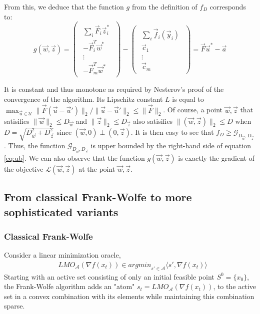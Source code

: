 From this, we deduce that the function $g$ from the definition of $f_D$ corresponds to:
\begin{equation}
  g(\vec w, \vec z) =
  \begin{pmatrix}
    \begin{array}{c}
      \sum_i \vec F_i \vec z_i^*\\
      - \vec F_i^T \vec w^*\\
      \vdots\\
      - \vec F_m^T \vec w^*
    \end{array}
  \end{pmatrix} -
  \begin{pmatrix}
    \begin{array}{c}
      \sum_i \vec f_i (\vec y_i)\\
      \vec c_1\\
      \vdots\\
      \vec c_m
    \end{array}
  \end{pmatrix} = \vec F \vec u^* - \vec a
\end{equation}


It is constant and thus monotone as required by Nesterov's proof of the
convergence of the algorithm. Its Lipschitz constant $L$ is equal to $\max_{\vec
u \in \mathcal{U}} \lVert \vec F (\vec u - \vec u') \rVert_2 / \lVert \vec u -
\vec u' \rVert_2 \leq \lVert \vec F \rVert_2$. Of course, a point $\vec w, \vec
z$ that satisifies $\lVert \vec w \rVert_2 \leq D_{\vec w}$ and $\lVert \vec z
\rVert_2 \leq D_{\vec z}$ also satisifies $\lVert (\vec w, \vec z) \rVert_2 \leq
D$ when $D = \sqrt{D_{\vec w}^2 + D_{\vec z}^2}$ since $(\vec w, 0) \perp (0,
\vec z)$. It is then easy to see that $f_D \geq \mathcal{G}_{D_{\vec w}, D_{\vec
z}}$. Thus, the function $\mathcal{G}_{D_{\vec w}, D_{\vec z}}$ is upper bounded
by the right-hand side of equation \ref{eq:ub}. We can also observe that the
function $g(\vec w, \vec z)$ is exactly the gradient of the objective
$\mathcal{L}(\vec w, \vec z)$ at the point $\vec w, \vec z$.



\subsection{From classical Frank-Wolfe to more sophisticated variants}
\subsubsection{Classical Frank-Wolfe}
Consider a linear minimization oracle,
\begin{equation*}
\begin{aligned}
    &LMO_{\mathcal{A}}(\nabla f(x_{t}))\in \textit{argmin}_{s\prime\in\mathcal{A}}\langle s\prime, \nabla f(x_{t})\rangle
\end{aligned}
\end{equation*}
Starting with an active set consisting of only an initial feasible point $S^{0}=
\{x_{0}\}$, the Frank-Wolfe algorithm adds an "atom" $s_{t}=
LMO_{\mathcal{A}}(\nabla f(x_{t}))$, to the active set in a convex combination
with its elements while maintaining this combination sparse.
